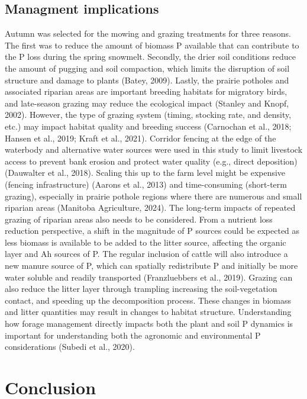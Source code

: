 \documentclass[
]{agujournal2019}
\begin{document}
\subsection{Managment implications}\label{managment-implications}

Autumn was selected for the mowing and grazing treatments for three
reasons. The first was to reduce the amount of biomass P available that
can contribute to the P loss during the spring snowmelt. Secondly, the
drier soil conditions reduce the amount of pugging and soil compaction,
which limits the disruption of soil structure and damage to plants
(Batey, 2009). Lastly, the prairie potholes and associated riparian
areas are important breeding habitats for migratory birds, and
late-season grazing may reduce the ecological impact (Stanley and Knopf,
2002). However, the type of grazing system (timing, stocking rate, and
density, etc.) may impact habitat quality and breeding success
(Carnochan et al., 2018; Hansen et al., 2019; Kraft et al., 2021).
Corridor fencing at the edge of the waterbody and alternative water
sources were used in this study to limit livestock access to prevent
bank erosion and protect water quality (e.g., direct deposition)
(Dauwalter et al., 2018). Scaling this up to the farm level might be
expensive (fencing infrastructure) (Aarons et al., 2013) and
time-consuming (short-term grazing), especially in prairie pothole
regions where there are numerous and small riparian areas (Manitoba
Agriculture, 2024). The long-term impacts of repeated grazing of
riparian areas also needs to be considered. From a nutrient loss
reduction perspective, a shift in the magnitude of P sources could be
expected as less biomass is available to be added to the litter source,
affecting the organic layer and Ah sources of P. The regular inclusion
of cattle will also introduce a new manure source of P, which can
spatially redistribute P and initially be more water soluble and readily
transported (Franzluebbers et al., 2019). Grazing can also reduce the
litter layer through trampling increasing the soil-vegetation contact,
and speeding up the decomposition process. These changes in biomass and
litter quantities may result in changes to habitat structure.
Understanding how forage management directly impacts both the plant and
soil P dynamics is important for understanding both the agronomic and
environmental P considerations (Subedi et al., 2020).

\section{Conclusion}\label{conclusion}
\end{document}
